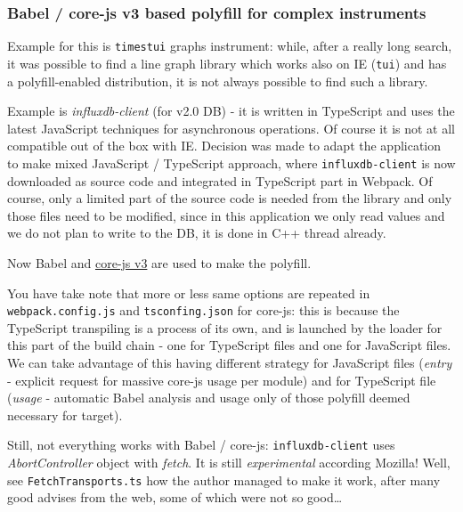 \documentclass[11pt]{article}
\begin{document}
    \hypertarget{babel-core-js-v3-based-polyfill-for-complex-instruments}{%
\subsubsection{Babel / core-js v3 based polyfill for complex
instruments}\label{babel-core-js-v3-based-polyfill-for-complex-instruments}}

    Example for this is \texttt{timestui} graphs instrument: while, after a
really long search, it was possible to find a line graph library which
works also on IE (\texttt{tui}) and has a polyfill-enabled distribution,
it is not always possible to find such a library.

    Example is \emph{influxdb-client} (for v2.0 DB) - it is written in
TypeScript and uses the latest JavaScript techniques for asynchronous
operations. Of course it is not at all compatible out of the box with
IE. Decision was made to adapt the application to make mixed JavaScript
/ TypeScript approach, where \texttt{influxdb-client} is now downloaded
as source code and integrated in TypeScript part in Webpack. Of course,
only a limited part of the source code is needed from the library and
only those files need to be modified, since in this application we only
read values and we do not plan to write to the DB, it is done in C++
thread already.

    Now Babel and
\href{https://github.com/zloirock/core-js/blob/master/docs/2019-03-19-core-js-3-babel-and-a-look-into-the-future.md}{core-js
v3} are used to make the polyfill.

    You have take note that more or less same options are repeated in
\texttt{webpack.config.js} and \texttt{tsconfing.json} for core-js: this
is because the TypeScript transpiling is a process of its own, and is
launched by the loader for this part of the build chain - one for
TypeScript files and one for JavaScript files. We can take advantage of
this having different strategy for JavaScript files (\emph{entry} -
explicit request for massive core-js usage per module) and for
TypeScript file (\emph{usage} - automatic Babel analysis and usage only
of those polyfill deemed necessary for target).

    Still, not everything works with Babel / core-js:
\texttt{influxdb-client} uses \emph{AbortController} object with
\emph{fetch}. It is still \emph{experimental} according Mozilla! Well,
see \texttt{FetchTransports.ts} how the author managed to make it work,
after many good advises from the web, some of which were not so
good\ldots{}
\end{document}
